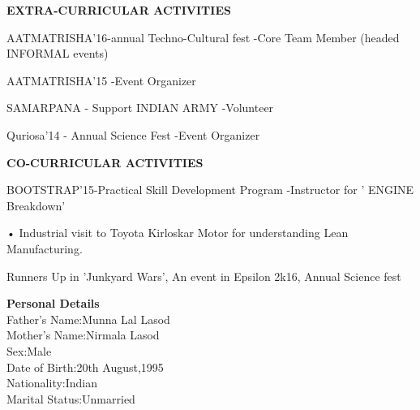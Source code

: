 \documentclass{article}
\begin{document}
\begin{center}

\textbf{\LARGE EXTRA-CURRICULAR ACTIVITIES}
\begin{itemize}
	{\large \item AATMATRISHA'16-annual Techno-Cultural fest
		-Core Team Member (headed INFORMAL events) }
	{\large \item AATMATRISHA'15
		-Event Organizer}
	{\large \item SAMARPANA - Support INDIAN ARMY
		-Volunteer }
	{\large \item Quriosa'14 - Annual Science Fest
		-Event Organizer }
\end{itemize}\vspace{15px}


\textbf{\LARGE CO-CURRICULAR ACTIVITIES}
\begin{enumerate}
	{\large \item BOOTSTRAP'15-Practical Skill Development
		Program
		-Instructor for ' ENGINE Breakdown' }
	
	{\large \item •	Industrial visit to Toyota Kirloskar Motor for understanding Lean Manufacturing. }
	{\large \item Runners Up in 'Junkyard Wars',
		An event in Epsilon 2k16, Annual Science fest }
\end{enumerate}\vspace{15px}

\end{center}


\textbf{\LARGE Personal Details}\\
{\normalsize Father's Name:Munna Lal Lasod\\
	Mother's Name:Nirmala Lasod\\
	Sex:Male\\
	Date of Birth:20th August,1995\\
	Nationality:Indian\\
	Marital Status:Unmarried\\}
\end{document}
